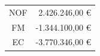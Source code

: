 \begin{table}[h]
    \centering
    \begin{tabular}{|c|r|}
        \hline
        NOF & 2.426.246,00 € \\
        FM & -1.344.100,00 € \\
        EC & -3.770.346,00 € \\
        \hline
    \end{tabular}
\end{table}
